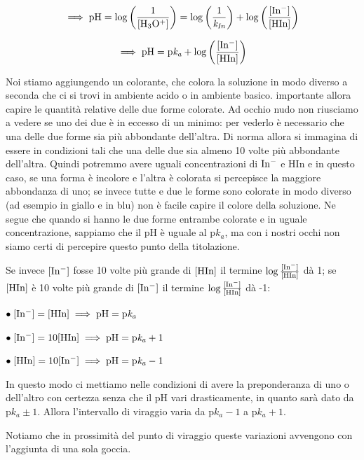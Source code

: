 $$\implies \rm pH = log \left( \frac{1}{[H_3O^+]} \right) = log \left( \frac{1}{\textit{k}_{\textit{In}}} \right) + log \left( \frac{\rm{[In^-]}}{\rm{[HIn]}} \right)$$

$$\implies \rm pH= p\textit{k}_\textit{a} + log \left( \frac{\rm{[In^-]}}{\rm{[HIn]}} \right)$$

Noi stiamo aggiungendo un colorante, che colora la soluzione in modo diverso a seconda che ci si trovi in ambiente acido o in ambiente basico. \E importante allora capire le quantità relative delle due forme colorate. Ad occhio nudo non riusciamo a vedere se uno dei due è in eccesso di un minimo: per vederlo è necessario che una delle due forme sia più abbondante dell'altra. Di norma allora si immagina di essere in condizioni tali che una delle due sia almeno 10 volte più abbondante dell'altra. Quindi potremmo avere uguali concentrazioni di $\rm In^-$ e HIn e in questo caso, se una forma è incolore e l'altra è colorata si percepisce la maggiore abbondanza di uno; se invece tutte e due le forme sono colorate in modo diverso (ad esempio in giallo e in blu) non è facile capire il colore della soluzione. Ne segue che quando si hanno le due forme entrambe colorate e in uguale concentrazione, sappiamo che il pH è uguale al p$k_a$, ma con i nostri occhi non siamo certi di percepire questo punto della titolazione.

Se invece $\rm [In^-]$ fosse 10 volte più grande di $\rm [HIn]$ il termine $\rm \log{\frac{[In^-]}{[HIn]}}$ dà 1; se $\rm [HIn]$ è 10 volte più grande di $\rm [In^-]$ il termine $\rm \log{\frac{[In^-]}{[HIn]}}$ dà -1:

\vspace{0.2cm}$\bullet \rm \; [In^-]=[HIn] \implies pH=p\textit{k}_{\textit{a}}$

\vspace{0.2cm}$\bullet \rm \; [In^-]=10[HIn] \implies pH=p\textit{k}_{\textit{a}}+1$

\vspace{0.2cm}$\bullet \rm \; [HIn]=10[In^-] \implies pH=p\textit{k}_{\textit{a}}-1$

\vspace{0.2cm}In questo modo ci mettiamo nelle condizioni di avere la preponderanza di uno o dell'altro con certezza senza che il pH vari drasticamente, in quanto sarà dato da p$k_a \pm 1$. Allora l'intervallo di viraggio varia da p$k_a - 1$ a p$k_a + 1$.

Notiamo che in prossimità del punto di viraggio queste variazioni avvengono con l'aggiunta di una sola goccia.

